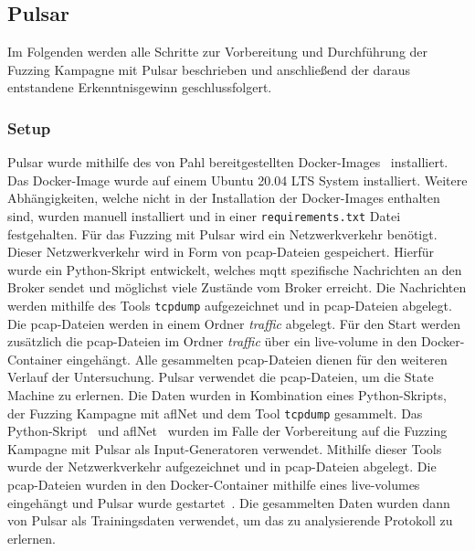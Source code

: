 
\subsection{Pulsar}\label{subsec:pulsar}
Im Folgenden werden alle Schritte zur Vorbereitung und Durchführung der Fuzzing Kampagne mit Pulsar beschrieben und
anschließend der daraus entstandene Erkenntnisgewinn geschlussfolgert.
\subsubsection{Setup}
Pulsar wurde mithilfe des von Pahl bereitgestellten Docker-Images~\cite{pulsar-docker} installiert.
Das Docker-Image wurde auf einem Ubuntu 20.04 LTS System installiert.
Weitere Abhängigkeiten, welche nicht in der Installation der Docker-Images enthalten sind, wurden manuell installiert und
in einer \texttt{requirements.txt} Datei festgehalten.
Für das Fuzzing mit Pulsar wird ein Netzwerkverkehr benötigt.
Dieser Netzwerkverkehr wird in Form von \gls{pcap}-Dateien gespeichert.
Hierfür wurde ein Python-Skript entwickelt, welches \gls{mqtt} spezifische Nachrichten an den Broker sendet und möglichst
viele Zustände vom Broker erreicht.
Die Nachrichten werden mithilfe des Tools \texttt{tcpdump} aufgezeichnet und in \gls{pcap}-Dateien abgelegt.
Die \gls{pcap}-Dateien werden in einem Ordner \textit{traffic} abgelegt.
Für den Start werden zusätzlich die \gls{pcap}-Dateien im Ordner \textit{traffic} über ein live-volume in den
Docker-Container eingehängt.
Alle gesammelten pcap-Dateien dienen für den weiteren Verlauf der Untersuchung.
Pulsar verwendet die \gls{pcap}-Dateien, um die State Machine zu erlernen.\newline\newline
Die Daten wurden in Kombination eines Python-Skripts, der Fuzzing Kampagne mit \gls{afl}Net und dem Tool
\texttt{tcpdump} gesammelt.
Das Python-Skript~\cite{python-script-input-generation} und \gls{afl}Net~\cite{aflnet-capture-traffic} wurden im Falle der Vorbereitung
auf die Fuzzing Kampagne mit Pulsar als Input-Generatoren verwendet.
Mithilfe dieser Tools wurde der Netzwerkverkehr aufgezeichnet und in \gls{pcap}-Dateien abgelegt.
Die \gls{pcap}-Dateien wurden in den Docker-Container mithilfe eines live-volumes eingehängt und Pulsar wurde gestartet~\cite{run-pulsar}.
Die gesammelten Daten wurden dann von Pulsar als Trainingsdaten verwendet, um das zu analysierende Protokoll zu erlernen.
